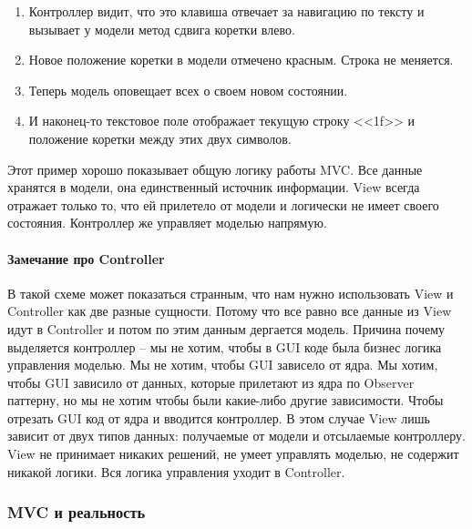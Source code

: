 \begin{enumerate}
\item Контроллер видит, что это клавиша отвечает за навигацию по тексту и вызывает у модели метод сдвига коретки влево.

\item Новое положение коретки в модели отмечено красным.
Строка не меняется.

\item Теперь модель оповещает всех о своем новом состоянии.

\item И наконец-то текстовое поле отображает текущую строку <<1f>> и положение коретки между этих двух символов.
\end{enumerate}
Этот пример хорошо показывает общую логику работы MVC.
Все данные хранятся в модели, она единственный источник информации.
View всегда отражает только то, что ей прилетело от модели и логически не имеет своего состояния.
Контроллер же управляет моделью напрямую.

\paragraph{Замечание про Controller}

В такой схеме может показаться странным, что нам нужно использовать View и Controller как две разные сущности.
Потому что все равно все данные из View идут в Controller и потом по этим данным дергается модель.
Причина почему выделяется контроллер -- мы не хотим, чтобы в GUI коде была бизнес логика управления моделью.
Мы не хотим, чтобы GUI зависело от ядра.
Мы хотим, чтобы GUI зависило от данных, которые прилетают из ядра по Observer паттерну, но мы не хотим чтобы были какие-либо другие зависимости.
Чтобы отрезать GUI код от ядра и вводится контроллер.
В этом случае View лишь зависит от двух типов данных: получаемые от модели и отсылаемые контроллеру.
View не принимает никаких решений, не умеет управлять моделью, не содержит никакой логики.
Вся логика управления уходит в Controller.

\subsubsection{MVC и реальность}

